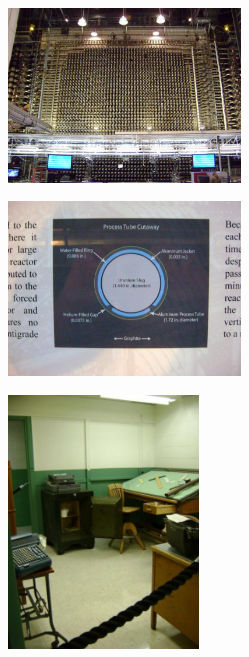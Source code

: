 \documentclass[aspectratio=1610,pdftex,dvipsnames,compress,xcolor={dvipsnames}]{beamer}
\begin{document}
\begin{frame}{}
    \begin{figure}
        \centering
        \includegraphics[width=0.55\textwidth]{hb10.jpg}
    \end{figure}
\end{frame}


\begin{frame}{}
    \begin{figure}
        \centering
        \includegraphics[width=0.55\textwidth]{hb11.jpg}
    \end{figure}
\end{frame}


\begin{frame}{}
    \begin{figure}
        \centering
        \includegraphics[width=0.45\textwidth]{hb12.jpg}
    \end{figure}
\end{frame}
\end{document}
